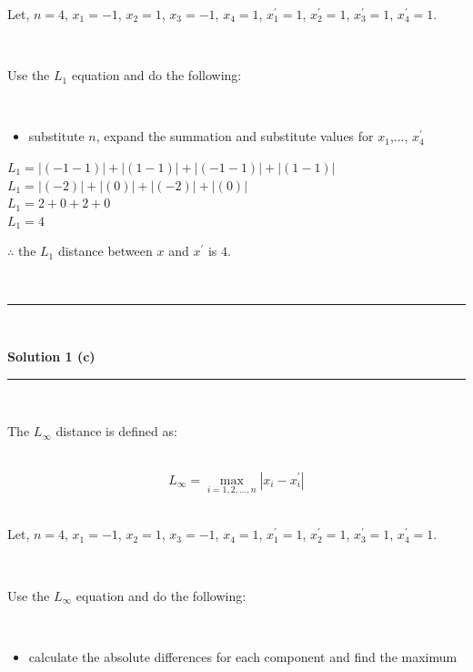 \documentclass{article}
\begin{document}
\parbox{\textwidth}{Let, $n = 4$, $x_1 = -1$, $x_2 = 1$, $x_3 = -1$, $x_4 = 1$, $x^{\prime}_1 = 1$, $x^{\prime}_2 = 1$, $x^{\prime}_3 = 1$, $x^{\prime}_4 = 1$.}\\

\parbox{\textwidth}{Use the $L_1$ equation and do the following:}\\

\begin{itemize}
    \item {substitute $n$, expand the summation and substitute values for $x_1$,..., $x^{\prime}_4$}\\
\end{itemize}

$L_1 = |(-1 - 1)| + |(1 - 1)| + |(-1 - 1)| + |(1 - 1)|$\\

$L_1 = |(-2)| + |(0)| + |(-2)| + |(0)|$\\

$L_1 = 2 + 0 + 2 + 0$\\

$L_1 = 4$\\

\parbox{\textwidth}{$\therefore$ the $L_1$ distance between $x$ and $x^{\prime}$ is $4$.}\\

\noindent\rule{\textwidth}{0.4pt}\\

\newpage

\textbf{Solution 1 (c)}

\noindent\rule{\textwidth}{0.4pt}\\

\parbox{\textwidth}{The $L_{\infty}$ distance is defined as:}\\

$$L_{\infty} = \max_{i=1,2,...,n} |x_i - x^{\prime}_i|$$\\

\parbox{\textwidth}{Let, $n = 4$, $x_1 = -1$, $x_2 = 1$, $x_3 = -1$, $x_4 = 1$, $x^{\prime}_1 = 1$, $x^{\prime}_2 = 1$, $x^{\prime}_3 = 1$, $x^{\prime}_4 = 1$.}\\

\parbox{\textwidth}{Use the $L_{\infty}$ equation and do the following:}\\

\begin{itemize}
    \item {calculate the absolute differences for each component and find the maximum}\\
\end{itemize}
\end{document}
